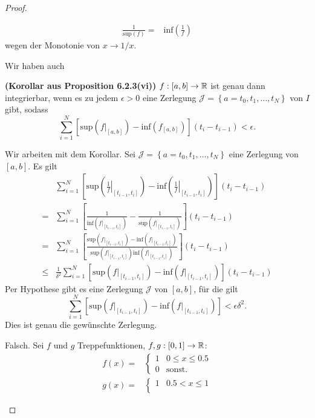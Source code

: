 \begin{proof}
\begin{parts}
\begin{tcolorbox}[title=Bemerkung]
\begin{align*}
				\frac{1}{\text{sup}(f)}=&\text{inf}\left( \frac{1}{f} \right) 
			\end{align*}
			wegen der Monotonie von $x\to 1 / x$.
		\end{tcolorbox}
		Wir haben auch
		\begin{tcolorbox}[title=Korollar]
			\textbf{(Korollar aus Proposition 6.2.3(vi))} $f:[a,b]\to \mathbb{R}$ ist genau dann integrierbar, wenn es zu jedem $\epsilon>0$ eine Zerlegung $\mathcal{J}=\left\{ a=t_0,t_1,\dots,t_N \right\} $ von $I$ gibt, sodass
			\[
				\sum_{i=1}^{N} \left[ \text{sup}\left( f|_{[a,b]} \right) -\text{inf}\left( f_{[a,b]} \right)  \right](t_i-t_{i-1})<\epsilon 
			.\] 
		\end{tcolorbox}
		Wir arbeiten mit dem Korollar. Sei $\mathcal{J}=\left\{ a=t_0,t_1,\dots,t_N \right\} $ eine Zerlegung von $[a,b]$. Es gilt
		\begin{align*}
		&	\sum_{i=1}^{N} \left[ \text{sup}\left( \left.\frac{1}{f}\right|_{[t_{i-1},t_i]}\right)-\text{inf}\left( \left.\frac{1}{f}\right|_{[t_{i-1},t_i]} \right)  \right](t_i-t_{i-1})\\
			=&\sum_{i=1}^{N} \left[ \frac{1}{\text{inf}\left( f|_{[t_{i-1},t_i]} \right) }-\frac{1}{\text{sup}\left( f|_{[t_{i-1},t_i]} \right) } \right](t_i-t_{i-1})\\
			=&\sum_{i=1}^{N} \left[\frac{\text{sup}\left( f|_{[t_{i-1},t_i]} \right) -\text{inf}\left( f|_{[t_{i-1},t_i]} \right)}{\text{sup}\left( f|_{[t_{i-1},t_i]} \right)\text{inf}\left( f|_{[t_{i-1},t_i]} \right) }  \right](t_i-t_{i-1})\\
			\le&\frac{1}{\delta^2}\sum_{i=1}^N\left[\text{sup}\left( f|_{[t_{i-1},t_i]} \right) -\text{inf}\left( f|_{[t_{i-1},t_i]}\right)\right](t_i-t_{i-1})
		\end{align*}
		Per Hypothese gibt es eine Zerlegung $\mathcal{J}$ von $[a,b]$, f\"{u}r die gilt
		\[
			\sum_{i=1}^{N}\left[ \text{sup}\left( f|_{[t_{i-1},t_i]} \right) -\text{inf}\left( f|_{[t_{i-1},t_i]} \right)  \right] < \epsilon\delta^2
		.\]
		Dies ist genau die gewünschte Zerlegung.
	\item Falsch. Sei $f$ und $g$ Treppefunktionen, $f,g:[0,1]\to \mathbb{R}$:
		\begin{align*}
			f(x)=&\begin{cases}
				1 & 0 \le x \le 0.5\\
				0 & \text{sonst}.
			\end{cases}\\
				g(x)=&\begin{cases}
					1 & 0.5 < x \le 1\\

\end{cases}
\end{align*}
\end{parts}
\end{proof}
